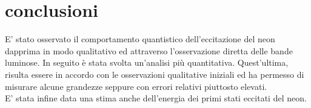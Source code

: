 \section{conclusioni}
E' stato osservato il comportamento quantistico dell'eccitazione del neon dapprima in modo qualitativo ed attraverso l'osservazione diretta delle bande luminose. In seguito è stata svolta un'analisi più quantitativa. Quest'ultima, risulta essere in accordo con le osservazioni qualitative iniziali ed ha permesso di misurare alcune grandezze seppure con errori relativi piuttosto elevati.\\
E' stata infine data una stima anche dell'energia dei primi stati eccitati del neon.
